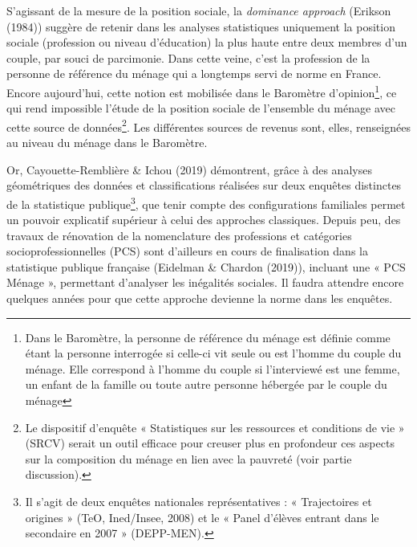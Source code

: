 \documentclass[12pt,a4paper]{reedthesis}
\begin{document}
S'agissant de la mesure de la position sociale, la \emph{dominance approach} (Erikson (1984)) suggère de retenir dans les analyses statistiques uniquement la position sociale (profession ou niveau d'éducation) la plus haute entre deux membres d'un couple, par souci de parcimonie. Dans cette veine, c'est la profession de la personne de référence du ménage qui a longtemps servi de norme en France. Encore aujourd'hui, cette notion est mobilisée dans le Baromètre d'opinion\footnote{Dans le Baromètre, la personne de référence du ménage est définie comme étant la personne interrogée si celle-ci vit seule ou est l'homme du couple du ménage. Elle correspond à l'homme du couple si l'interviewé est une femme, un enfant de la famille ou toute autre personne hébergée par le couple du ménage}, ce qui rend impossible l'étude de la position sociale de l'ensemble du ménage avec cette source de données\footnote{ Le dispositif d'enquête « Statistiques sur les ressources et conditions de vie » (SRCV) serait un outil efficace pour creuser plus en profondeur ces aspects sur la composition du ménage en lien avec la pauvreté (voir partie discussion).}. Les différentes sources de revenus sont, elles, renseignées au niveau du ménage dans le Baromètre.

Or, Cayouette-Remblière \& Ichou (2019) démontrent, grâce à des analyses géométriques des données et classifications réalisées sur deux enquêtes distinctes de la statistique publique\footnote{ Il s'agit de deux enquêtes nationales représentatives : « Trajectoires et origines » (TeO, Ined/Insee, 2008) et le « Panel d'élèves entrant dans le secondaire en 2007 » (DEPP-MEN).}, que tenir compte des configurations familiales permet un pouvoir explicatif supérieur à celui des approches classiques. Depuis peu, des travaux de rénovation de la nomenclature des professions et catégories socioprofessionnelles (PCS) sont d'ailleurs en cours de finalisation dans la statistique publique française (Eidelman \& Chardon (2019)), incluant une « PCS Ménage », permettant d'analyser les inégalités sociales. Il faudra attendre encore quelques années pour que cette approche devienne la norme dans les enquêtes.
\end{document}
